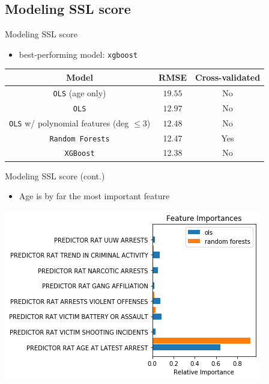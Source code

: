 \documentclass{beamer}
\begin{document}
\subsection{Modeling SSL score}

\begin{frame}{Modeling SSL score}
\begin{itemize}
    \item best-performing model: \texttt{xgboost}
\end{itemize}
\begin{table}[h!]
\centering
\begin{tabular}{||c c c||}
 \hline
 Model & RMSE & Cross-validated\\ [0.5ex] 
 \hline\hline
\texttt{OLS} (age only) & $19.55$ & No\\
\texttt{OLS} & $12.97$ & No\\
\texttt{OLS} w/ polynomial features (deg $\leq 3$) & $12.48$ & No\\
\texttt{Random Forests} & 12.47 & Yes\\
\texttt{XGBoost} & 12.38 & No\\
 \hline
\end{tabular}
\label{table:2}
\end{table}
\end{frame}

\begin{frame}{Modeling SSL score (cont.)}
\begin{itemize}
    \item Age is by far the most important feature
\end{itemize}
\begin{center}
\includegraphics[scale=.6]{feature_importances.png}
\end{center}
\end{frame}
\end{document}
